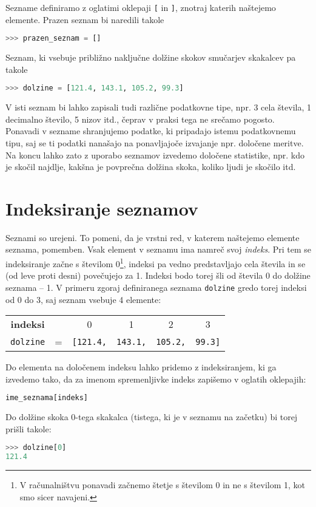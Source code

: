 Sezname definiramo z oglatimi oklepaji \texttt{[} in \texttt{]}, znotraj katerih naštejemo elemente. Prazen seznam bi naredili takole
\begin{lstlisting}[language=Python]
>>> prazen_seznam = []
\end{lstlisting}
Seznam, ki vsebuje približno naključne dolžine skokov smučarjev skakalcev pa takole
\begin{lstlisting}[language=Python]
>>> dolzine = [121.4, 143.1, 105.2, 99.3]
\end{lstlisting}
V isti seznam bi lahko zapisali tudi različne podatkovne tipe, npr. 3 cela števila, 1 decimalno število, 5 nizov itd., čeprav v praksi tega ne srečamo pogosto. Ponavadi v sezname shranjujemo podatke, ki pripadajo istemu podatkovnemu tipu, saj se ti podatki nanašajo na ponavljajoče izvajanje npr. določene meritve. Na koncu lahko zato z uporabo seznamov izvedemo določene statistike, npr. kdo je skočil najdlje, kakšna je povprečna dolžina skoka, koliko ljudi je skočilo itd.

\section{Indeksiranje seznamov}
Seznami so urejeni. To pomeni, da je vrstni red, v katerem naštejemo elemente seznama, pomemben. Vsak element v seznamu ima namreč svoj \emph{indeks}. Pri tem se indeksiranje začne s številom 0\footnote{V računalništvu ponavadi začnemo štetje s številom 0 in ne s številom 1, kot smo sicer navajeni.}, indeksi pa vedno predstavljajo cela števila in se (od leve proti desni) povečujejo za 1. Indeksi bodo torej šli od števila 0 do dolžine seznama -- 1. V primeru zgoraj definiranega seznama \texttt{dolzine} gredo torej indeksi od 0 do 3, saj seznam vsebuje 4 elemente:

\begin{tabular}{cccccc}
\textbf{indeksi} & & 0 & 1 & 2 & 3\\
\texttt{dolzine} & = & \texttt{[121.4,}& \texttt{143.1,} & \texttt{105.2,} & \texttt{99.3]}
\end{tabular}

\bigskip

Do elementa na določenem indeksu lahko pridemo z indeksiranjem, ki ga izvedemo tako, da za imenom spremenljivke indeks zapišemo v oglatih oklepajih:
\begin{lstlisting}[language=Python]
ime_seznama[indeks]
\end{lstlisting}
Do dolžine skoka 0-tega skakalca (tistega, ki je v seznamu na začetku) bi torej prišli takole:
\begin{lstlisting}[language=Python]
>>> dolzine[0]
121.4
\end{lstlisting}

